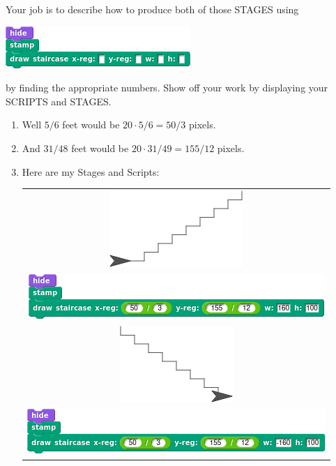 \documentclass[noauthor,nooutcomes,12pt,hints,handout]{ximera}
\begin{document}
\begin{question}
\begin{enumerate}
      Your job is to describe how to produce both of those STAGES using
      \begin{center}
        \includegraphics{stampDrawStaircaseBlockBlank.png}
      \end{center}
      by finding the appropriate numbers. Show off your work by displaying
      your SCRIPTS and STAGES.
  \end{enumerate}
  \begin{freeResponse}
    \begin{enumerate}
    \item Well $5/6$ feet would be $20\cdot 5/6 = 50/3$ pixels.
    \item And $31/48$ feet would be $20 \cdot 31/49=155/12$ pixels.
    \item Here are my Stages and Scripts:
      \begin{center}
        \begin{tabular}{|c|}\hline
          \includegraphics{stampStageStairsFwd.png} \\
          \includegraphics{stampDrawStaircaseBlockFwd.png}  \\\hline\hline
          \includegraphics{stampStageStairsRev.png} \\
          \includegraphics{stampDrawStaircaseBlockRev.png}\\\hline
        \end{tabular}
      \end{center}
    \end{enumerate}
  \end{freeResponse}
\end{question}
\end{document}
